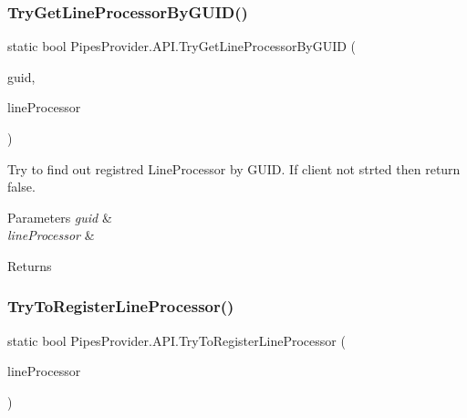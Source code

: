 \subsubsection{\texorpdfstring{Try\+Get\+Line\+Processor\+By\+G\+U\+I\+D()}{TryGetLineProcessorByGUID()}}
{\footnotesize\ttfamily static bool Pipes\+Provider.\+A\+P\+I.\+Try\+Get\+Line\+Processor\+By\+G\+U\+ID (\begin{DoxyParamCaption}\item[{string}]{guid,  }\item[{out \mbox{\hyperlink{class_pipes_provider_1_1_transmission_line}{Transmission\+Line}}}]{line\+Processor }\end{DoxyParamCaption})\hspace{0.3cm}{\ttfamily [static]}}



Try to find out registred Line\+Processor by G\+U\+ID. If client not strted then return false. 


\begin{DoxyParams}{Parameters}
{\em guid} & \\
\hline
{\em line\+Processor} & \\
\hline
\end{DoxyParams}
\begin{DoxyReturn}{Returns}

\end{DoxyReturn}
\mbox{\label{class_pipes_provider_1_1_a_p_i_af785a9d8707a831a6b84ac63ae96e755}} 
\subsubsection{\texorpdfstring{Try\+To\+Register\+Line\+Processor()}{TryToRegisterLineProcessor()}}
{\footnotesize\ttfamily static bool Pipes\+Provider.\+A\+P\+I.\+Try\+To\+Register\+Line\+Processor (\begin{DoxyParamCaption}\item[{\mbox{\hyperlink{class_pipes_provider_1_1_transmission_line}{Transmission\+Line}}}]{line\+Processor }\end{DoxyParamCaption})\hspace{0.3cm}{\ttfamily [static]}}



